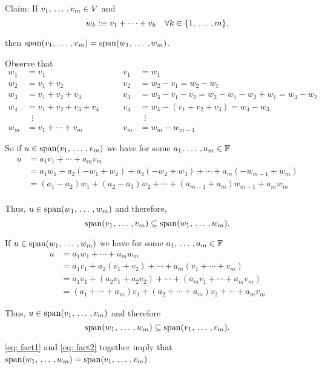 \begin{xrcs}
  Claim: If $v_1, {\, \ldots \,\,}, v_m \in V$ and
  \[
    w_k :\equiv v_1 + \cdots + v_k \quad \forall k\in \{1, {\, \ldots \,\,}, m\},
  \]

  then $\operatorname{span} (v_1, {\, \ldots \,\,}, v_m) = \operatorname{span} (w_1, {\, \ldots \,\,}, w_m)$.

  \begin{xprf}
    Observe that
    \[
    \begin{aligned}
      w_1 &= v_1
      & \qquad v_1 &= w_1       \\
      w_2 &= v_1 + v_2
      & \qquad v_2 &= w_2-v_1 = w_2 - w_1 \\
      w_3 &= \boxed{v_1 + v_2 + v_3}
      & \qquad v_3 &= w_3-v_1-v_2 = w_3-w_1-w_2+w_1 = w_3 - w_2 \\
      w_4 &= v_1 + v_2 + v_3 + v_4
      & \qquad v_4 &= w_4-\boxed{(v_1 + v_2 + v_3)}=w_4 - w_3 \\
      &\;\;\vdots
      &            &\;\;\vdots \\
      w_m &= v_1 + \cdots + v_m
      & \qquad v_m &= w_m - w_{m-1}
    \end{aligned}
    \]

    \StepOne So if $u \in \operatorname{span} (v_1, {\, \ldots \,\,}, v_m)$ we have for some $a_1, {\, \ldots \,\,}, a_m \in \mathbb{F}$
    \[
    \begin{aligned}
      u &= a_1 v_1 + \cdots + a_m v_m \\
      &= a_1 w_1 + a_2 (-w_1 + w_2) + a_3(-w_2 + w_3) + \cdots + a_m (-w_{m-1} + w_m) \\
      &= (a_1 - a_2) w_1 + (a_2-a_3) w_2 + \cdots + (a_{m-1} + a_m) w_{m-1} + a_m w_m \\
    \end{aligned}
    \]

    Thus, $u \in \operatorname{span} (w_1, {\, \ldots \,\,}, w_m)$ and therefore,
    \begin{equation}
      \label{eq: fact1}
      \operatorname{span} (v_1, {\, \ldots \,\,}, v_m) \subseteq \operatorname{span} (w_1, {\, \ldots \,\,}, w_m).
    \end{equation}


    \StepTwo If $u \in \operatorname{span} (w_1, {\, \ldots \,\,}, w_m)$ we have for some $a_1, {\, \ldots \,\,}, a_m \in \mathbb{F}$
    \[
    \begin{aligned}
      u &= a_1 w_1 + \cdots + a_m w_m \\
      &= a_1 v_1 + a_2 (v_1+v_2) + \cdots + a_m(v_1 + \cdots + v_m) \\
      &= a_1 v_1 + (a_2 v_1+ a_2 v_2) + \cdots + (a_m v_1 + \cdots + a_m v_m) \\
      &= (a_1 + \cdots + a_m) v_1 + (a_2 + \cdots + a_m) v_2 + \cdots + a_m v_m
    \end{aligned}
    \]

    Thus, $u \in \operatorname{span} (v_1, {\, \ldots \,\,}, v_m)$ and therefore
    \begin{equation}
      \label{eq: fact2}
      \operatorname{span} (w_1, {\, \ldots \,\,}, w_m) \subseteq \operatorname{span} (v_1, {\, \ldots \,\,}, v_m).
    \end{equation}

    \eqref{eq: fact1} and \eqref{eq: fact2} together imply that $\operatorname{span} (w_1, {\, \ldots \,\,}, w_m) = \operatorname{span} (v_1, {\, \ldots \,\,}, v_m)$.
  \end{xprf}
\end{xrcs}



